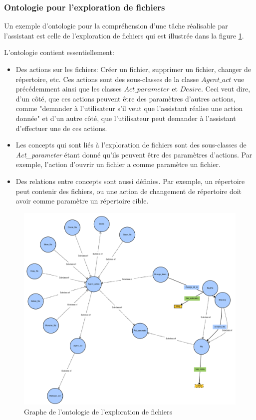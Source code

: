 \subsubsection*{Ontologie pour l'exploration de fichiers}\label{onto2}
Un exemple d'ontologie pour la compréhension d'une tâche réalisable par l'assistant est celle de l'exploration de fichiers qui est illustrée dans la figure \ref{onto_browser}.
\par
L'ontologie contient essentiellement:
\begin{itemize}
	\item Des actions sur les fichiers: Créer un fichier, supprimer un fichier, changer de répertoire, etc. Ces actions sont des sous-classes de la classe $Agent\_act$ vue précédemment ainsi que les classes $Act\_parameter$ et $Desire$. Ceci veut dire, d'un côté, que ces actions peuvent être des paramètres d'autres actions, comme "demander à l'utilisateur s'il veut que l'assistant réalise une action donnée" et d'un autre côté, que l'utilisateur peut demander à l'assistant d'effectuer une de ces actions. 
	\item Les concepts qui sont liés à l'exploration de fichiers sont des sous-classes de \textit{Act\_parameter} étant donné qu'ils peuvent  être des paramètres d'actions. Par exemple, l'action d'ouvrir un fichier a comme paramètre un fichier.
	\item Des relations entre concepts sont aussi définies. Par exemple, un répertoire peut contenir des fichiers, ou une action de changement de répertoire doit avoir comme paramètre un répertoire cible.
\end{itemize}
\begin{figure}[H]
	
	\centering
	\includegraphics[width=1.1\linewidth]{images/Conception/DM/onto_browser.png}
	\caption{Graphe de l'ontologie de l'exploration de fichiers}\label{onto_browser}
\end{figure}

